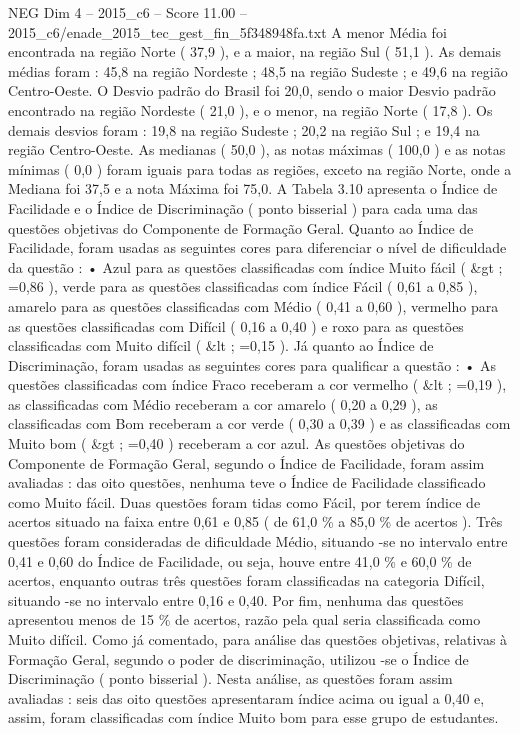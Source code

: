 \begin{textsample}{NEG Dim 4 – 2015\_c6 – Score 11.00 – 2015\_c6/enade\_2015\_tec\_gest\_fin\_5f348948fa.txt}
A menor Média foi encontrada na região Norte ( 37,9 ), e a maior, na região Sul ( 51,1 ).
As demais médias foram : 45,8 na região Nordeste ; 48,5 na região Sudeste ; e 49,6 na região Centro-Oeste.
O Desvio padrão do Brasil foi 20,0, sendo o maior Desvio padrão encontrado na região Nordeste ( 21,0 ), e o menor, na região Norte ( 17,8 ).
Os demais desvios foram : 19,8 na região Sudeste ; 20,2 na região Sul ; e 19,4 na região Centro-Oeste.
As medianas ( 50,0 ), as notas máximas ( 100,0 ) e as notas mínimas ( 0,0 ) foram iguais para todas as regiões, exceto na região Norte, onde a Mediana foi 37,5 e a nota Máxima foi 75,0.
A Tabela 3.10 apresenta o Índice de Facilidade e o Índice de Discriminação ( ponto bisserial ) para cada uma das questões objetivas do Componente de Formação Geral.
Quanto ao Índice de Facilidade, foram usadas as seguintes cores para diferenciar o nível de dificuldade da questão : • Azul para as questões classificadas com índice Muito fácil ( \&gt ; =0,86 ), verde para as questões classificadas com índice Fácil ( 0,61 a 0,85 ), amarelo para as questões classificadas com Médio ( 0,41 a 0,60 ), vermelho para as questões classificadas com Difícil ( 0,16 a 0,40 ) e roxo para as questões classificadas com Muito difícil ( \&lt ; =0,15 ).
Já quanto ao Índice de Discriminação, foram usadas as seguintes cores para qualificar a questão : • As questões classificadas com índice Fraco receberam a cor vermelho ( \&lt ; =0,19 ), as classificadas com Médio receberam a cor amarelo ( 0,20 a 0,29 ), as classificadas com Bom receberam a cor verde ( 0,30 a 0,39 ) e as classificadas com Muito bom ( \&gt ; =0,40 ) receberam a cor azul.
As questões objetivas do Componente de Formação Geral, segundo o Índice de Facilidade, foram assim avaliadas : das oito questões, nenhuma teve o Índice de Facilidade classificado como Muito fácil.
Duas questões foram tidas como Fácil, por terem índice de acertos situado na faixa entre 0,61 e 0,85 ( de 61,0 \% a 85,0 \% de acertos ).
Três questões foram consideradas de dificuldade Médio, situando -se no intervalo entre 0,41 e 0,60 do Índice de Facilidade, ou seja, houve entre 41,0 \% e 60,0 \% de acertos, enquanto outras três questões foram classificadas na categoria Difícil, situando -se no intervalo entre 0,16 e 0,40.
Por fim, nenhuma das questões apresentou menos de 15 \% de acertos, razão pela qual seria classificada como Muito difícil.
Como já comentado, para análise das questões objetivas, relativas à Formação Geral, segundo o poder de discriminação, utilizou -se o Índice de Discriminação ( ponto bisserial ).
Nesta análise, as questões foram assim avaliadas : seis das oito questões apresentaram índice acima ou igual a 0,40 e, assim, foram classificadas com índice Muito bom para esse grupo de estudantes.

\end{textsample}
